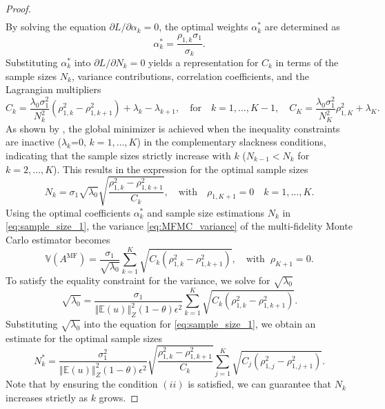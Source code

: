 \documentclass[final,3p,times,11pt]{elsarticle}
\begin{document}
\begin{proof}
\begin{align*}
\end{align*}
%
By solving the equation $\partial L/\partial \alpha_k=0$, the optimal weights $\alpha_k^*$ are determined as
%
\[
\alpha_k^*=\frac{\rho_{1,k}\sigma_1}{\sigma_k}.
\]
%
Substituting $\alpha_k^*$ into $\partial L/\partial N_k=0$ yields a representation for $C_k$ in terms of the sample sizes $N_k$, variance contributions, correlation coefficients, and the Lagrangian multipliers
%
\begin{equation*}
    C_k=\frac{\lambda_0\sigma_1^2}{N_k^2}\left(\rho_{1,k}^2-\rho_{1,k+1}^2\right)+\lambda_k-\lambda_{k+1},\quad \text{for} \quad k=1,\ldots,K-1,\quad C_K=\frac{\lambda_0\sigma_1^2}{N_K^2}\rho_{1,K}^2+\lambda_K.
\end{equation*}
%
 As shown by  \cite{PeWiGu:2016}, the global minimizer is achieved when the inequality constraints are inactive ($\lambda_k$=0, $k=1,\dots, K$) in the complementary slackness conditions, indicating that the sample sizes strictly increase with $k$ ($N_{k-1}< N_k$ for $k=2,\ldots, K$). This results in the expression for the optimal sample sizes
\begin{equation}
\label{eq:sample_size_1}
    N_k = \sigma_1\sqrt{\lambda_0}\sqrt{\frac{\rho_{1,k}^2-\rho_{1,k+1}^2}{C_k}},\quad \text{with}\quad  \rho_{1,K+1}=0 \quad k=1,\ldots,K.
\end{equation}
Using the optimal coefficients $\alpha_k^*$ and sample size estimations $N_k$ in \eqref{eq:sample_size_1}, the variance \eqref{eq:MFMC_variance} of the multi-fidelity Monte Carlo estimator becomes
%
\begin{equation*} \label{eq:MFMC_variance2}
    \mathbb{V}\left(A^{\text{MF}}\right) = \frac{\sigma_1}{\sqrt{\lambda_0}}\sum_{k=1}^K\sqrt{C_k\left(\rho_{1,k}^2-\rho_{1,k+1}^2\right)},\quad \text{with}\;\;\rho_{K+1}=0.
\end{equation*}
%
To satisfy the equality constraint for the variance,  we solve for $\sqrt{\lambda_0}$
%
\[
\sqrt{\lambda_0} = \frac{\sigma_1}{\left\Vert\mathbb{E}(u) \right\Vert_{Z}^2(1-\theta)\epsilon^2}\sum_{k=1}^K\sqrt{C_k\left(\rho_{1,k}^2-\rho_{1,k+1}^2\right)}.
\]
%
Substituting $\sqrt{\lambda_0}$ into  the equation for \eqref{eq:sample_size_1}, we obtain an estimate for the optimal sample sizes
%
\[
N_k^* = \frac{\sigma_1^2}{\left\Vert\mathbb{E}(u) \right\Vert_{Z}^2(1-\theta)\epsilon^2}\sqrt{\frac{\rho_{1,k}^2-\rho_{1,k+1}^2}{C_k}}\sum_{j=1}^K\sqrt{C_j\left(\rho_{1,j}^2-\rho_{1,j+1}^2\right)}.
\]
%
Note that by ensuring the condition $(ii)$ is satisfied, we can guarantee that $N_k$ increases strictly as $k$ grows. 
\end{proof}
\end{document}
